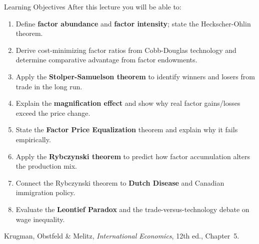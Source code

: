 \documentclass[aspectratio=169]{beamer}
\begin{document}
\begin{frame}{Learning Objectives}
After this lecture you will be able to:
\begin{enumerate}\small
  \item Define \textbf{factor abundance} and \textbf{factor
        intensity}; state the Heckscher-Ohlin theorem.
  \item Derive cost-minimizing factor ratios from Cobb-Douglas
        technology and determine comparative advantage
        from factor endowments.
  \item Apply the \textbf{Stolper-Samuelson theorem} to identify
        winners and losers from trade in the long run.
  \item Explain the \textbf{magnification effect} and show why
        real factor gains/losses exceed the price change.
  \item State the \textbf{Factor Price Equalization} theorem
        and explain why it fails empirically.
  \item Apply the \textbf{Rybczynski theorem} to predict how
        factor accumulation alters the production mix.
  \item Connect the Rybczynski theorem to \textbf{Dutch Disease}
        and Canadian immigration policy.
  \item Evaluate the \textbf{Leontief Paradox} and the
        trade-versus-technology debate on wage inequality.
\end{enumerate}
\begin{block}{}
\small Krugman, Obstfeld \& Melitz, \textit{International
Economics}, 12th ed., Chapter~5.
\end{block}
\end{frame}

\end{document}
